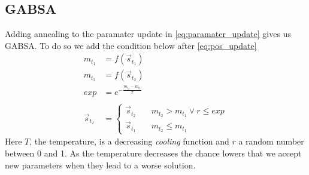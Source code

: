 \subsection{GABSA}
Adding annealing to the paramater update in \cref{eq:paramater_update} gives us GABSA. To do so we add the condition below after \cref{eq:pos_update}
%
\begin{subequations}[resume]
\begin{align}
	m_{t_1} &= f(\vec{s}_{t_1}) \\
	m_{t_2} &= f(\vec{s}_{t_2}) \\
	exp &= e^{-\frac{m_{t_2}-m_{t_1}}{T}} \\
	\\
	\vec{s}_{t_2} &= \left\{
		\begin{array}{ll}
			\vec{s}_{t_2} & \quad m_{t_2} > m_{t_1} \lor r \leq exp\\ 
			\vec{s}_{t_1} & \quad m_{t_2} \leq m_{t_1}
		\end{array}
	\right.
\end{align}
\end{subequations}
%
Here $T$, the temperature, is a decreasing \textit{cooling} function and $r$ a random number between 0 and 1. As the temperature decreases the chance lowers that we accept new parameters when they lead to a worse solution.
